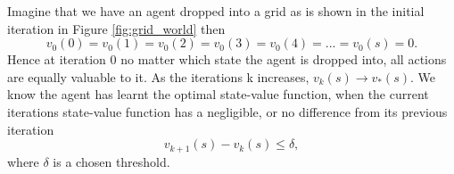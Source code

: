 Imagine that we have an agent dropped into a grid as is shown in the initial iteration in Figure \ref{fig:grid_world} then
\begin{equation}
	v_0(0) = v_0(1) = v_0(2) = v_0(3) = v_0(4) = ... = v_0(s) = 0.
\end{equation}
Hence at iteration 0 no matter which state the agent is dropped into, all actions are equally valuable to it. As the iterations k increases, $v_k(s) \rightarrow v_*(s)$. We know the agent has learnt the optimal state-value function, when the current iterations state-value function has a negligible, or no difference from its previous iteration 
\begin{equation}
	v_{k+1}(s) - v_k(s) \le \delta ,
\end{equation}
where $\delta$ is a chosen threshold.